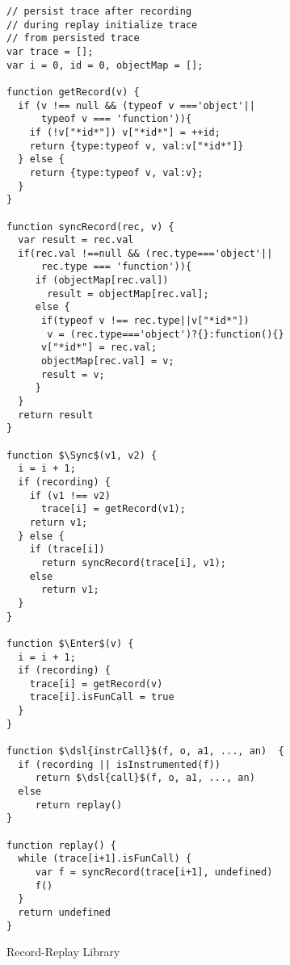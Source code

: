 \documentclass{sig-alternate}
\newcommand \dsl [1] {\ensuremath{{\tt #1}}\xspace}
\newcommand \Sync{\dsl{sync}}
\newcommand \Enter{\dsl{enter}}
\begin{document}
\lstset{language=JavaScript}
\begin{figure}
 {\scriptsize 
\begin{lstlisting}[mathescape]
// persist trace after recording
// during replay initialize trace 
// from persisted trace 
var trace = []; 
var i = 0, id = 0, objectMap = [];

function getRecord(v) {
  if (v !== null && (typeof v ==='object'||  
      typeof v === 'function')){
    if (!v["*id*"]) v["*id*"] = ++id;
    return {type:typeof v, val:v["*id*"]}
  } else {
    return {type:typeof v, val:v};
  }
}

function syncRecord(rec, v) {
  var result = rec.val
  if(rec.val !==null && (rec.type==='object'|| 
      rec.type === 'function')){
     if (objectMap[rec.val])
       result = objectMap[rec.val];
     else {
      if(typeof v !== rec.type||v["*id*"]) 
       v = (rec.type==='object')?{}:function(){}
      v["*id*"] = rec.val;
      objectMap[rec.val] = v;
      result = v;
     }
  }
  return result
}

function $\Sync$(v1, v2) {
  i = i + 1;
  if (recording) {
    if (v1 !== v2)
      trace[i] = getRecord(v1);
    return v1;
  } else {
    if (trace[i])
      return syncRecord(trace[i], v1);
    else
      return v1;
  }
}

function $\Enter$(v) {
  i = i + 1;
  if (recording) {
    trace[i] = getRecord(v)
    trace[i].isFunCall = true
  }
}

function $\dsl{instrCall}$(f, o, a1, ..., an)  {
  if (recording || isInstrumented(f)) 
     return $\dsl{call}$(f, o, a1, ..., an)
  else
     return replay()
}

function replay() {
  while (trace[i+1].isFunCall) {
     var f = syncRecord(trace[i+1], undefined)
     f()
  }
  return undefined
}
\end{lstlisting}
}
  \caption{Record-Replay Library}
  \label{fig:lib1}
\end{figure}
\end{document}

